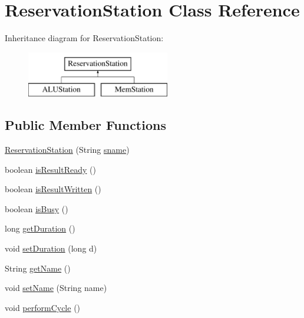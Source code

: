 \hypertarget{classReservationStation}{\section{\-Reservation\-Station \-Class \-Reference}
\label{classReservationStation}
}
\-Inheritance diagram for \-Reservation\-Station\-:\begin{figure}[H]
\begin{center}
\leavevmode
\includegraphics[height=2.000000cm]{classReservationStation}
\end{center}
\end{figure}
\subsection*{\-Public \-Member \-Functions}
\begin{DoxyCompactItemize}
\item 
\hyperlink{classReservationStation_ad155a9f0c4283cead97e512ce6d246ce}{\-Reservation\-Station} (\-String \hyperlink{classReservationStation_a2c0bd5b95f126395b0ab081394f090f6}{sname})
\item 
boolean \hyperlink{classReservationStation_aede190e7bfa282635f8a57ac3eaf74a5}{is\-Result\-Ready} ()
\item 
boolean \hyperlink{classReservationStation_a287759995344e119f4a108de7c648a76}{is\-Result\-Written} ()
\item 
boolean \hyperlink{classReservationStation_a26c60c26b4d03bbf7df5556d3b551621}{is\-Busy} ()
\item 
long \hyperlink{classReservationStation_a5775d6b5146a5392f8d6fdfa93b35309}{get\-Duration} ()
\item 
void \hyperlink{classReservationStation_ab9284f1b138b87ddcb50f4633d371a2f}{set\-Duration} (long d)
\item 
\-String \hyperlink{classReservationStation_a6b24d9296a10878d877a265a94ceec0b}{get\-Name} ()
\item 
void \hyperlink{classReservationStation_af1050ba62791a21550619fbe7ca76553}{set\-Name} (\-String name)
\item 
void \hyperlink{classReservationStation_a74dce4967c626f54888b1029169e8536}{perform\-Cycle} ()
\end{DoxyCompactItemize}
